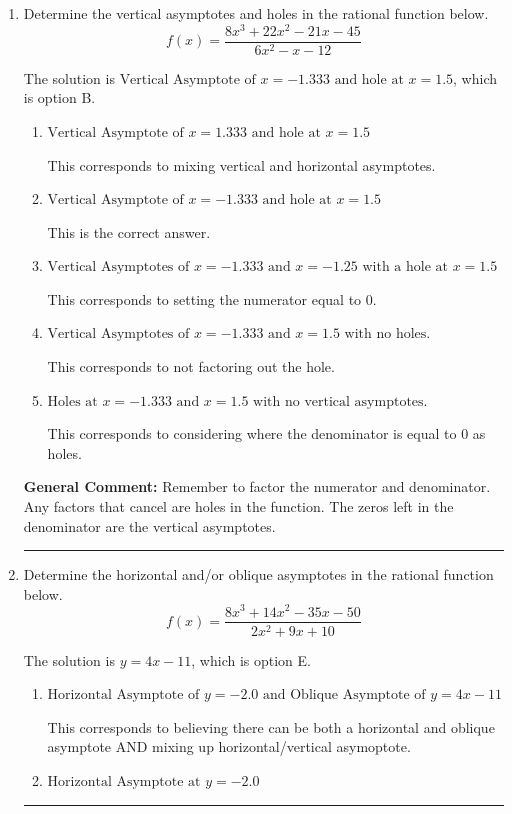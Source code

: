 \documentclass{extbook}[14pt]
\newcommand{\litem}[1]{\item #1

\rule{\textwidth}{0.4pt}}
\begin{document}
\begin{enumerate}\litem{
Determine the vertical asymptotes and holes in the rational function below.
\[ f(x) = \frac{8x^{3} +22 x^{2} -21 x -45}{6x^{2} -x -12} \]

The solution is \( \text{Vertical Asymptote of } x = -1.333 \text{ and hole at } x = 1.5 \), which is option B.\begin{enumerate}[label=\Alph*.]
\item \( \text{Vertical Asymptote of } x = 1.333 \text{ and hole at } x = 1.5 \)

This corresponds to mixing vertical and horizontal asymptotes.
\item \( \text{Vertical Asymptote of } x = -1.333 \text{ and hole at } x = 1.5 \)

This is the correct answer.
\item \( \text{Vertical Asymptotes of } x = -1.333 \text{ and } x = -1.25 \text{ with a hole at } x = 1.5 \)

This corresponds to setting the numerator equal to 0.
\item \( \text{Vertical Asymptotes of } x = -1.333 \text{ and } x = 1.5 \text{ with no holes.} \)

This corresponds to not factoring out the hole.
\item \( \text{Holes at } x = -1.333 \text{ and } x = 1.5 \text{ with no vertical asymptotes.} \)

This corresponds to considering where the denominator is equal to 0 as holes.
\end{enumerate}

\textbf{General Comment:} Remember to factor the numerator and denominator. Any factors that cancel are holes in the function. The zeros left in the denominator are the vertical asymptotes.
}
\litem{
Determine the horizontal and/or oblique asymptotes in the rational function below.
\[ f(x) = \frac{8x^{3} +14 x^{2} -35 x -50}{2x^{2} +9 x + 10} \]

The solution is \( y = 4x -11 \), which is option E.\begin{enumerate}[label=\Alph*.]
\item \( \text{Horizontal Asymptote of } y = -2.0 \text{ and Oblique Asymptote of } y = 4x -11 \)

This corresponds to believing there can be both a horizontal and oblique asymptote AND mixing up horizontal/vertical asymoptote.
\item \( \text{Horizontal Asymptote at } y = -2.0 \)


\end{enumerate}}
\end{enumerate}
\end{document}
